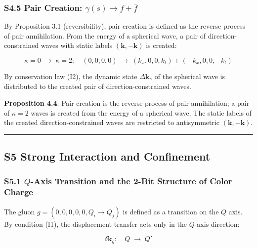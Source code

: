 \documentclass[
  a4paper,11pt]{article}
\theoremstyle{definition}
\theoremstyle{remark}
\begin{document}
\subsubsection{\texorpdfstring{S4.5 Pair Creation:
\(\gamma(s) \to f + \bar{f}\)}{S4.5 Pair Creation: \textbackslash gamma(s) \textbackslash to f + \textbackslash bar\{f\}}}\label{s4.5-pair-creation-gammas-to-f-barf}

By Proposition 3.1 (reversibility), pair creation is defined as the
reverse process of pair annihilation. From the energy of a spherical
wave, a pair of direction-constrained waves with static labels
\((\mathbf{k}, -\mathbf{k})\) is created:

\[\kappa = 0 \;\longrightarrow\; \kappa = 2:\quad (0, 0, 0, 0) \;\longrightarrow\; (k_x, 0, 0, k_t) + (-k_x, 0, 0, -k_t)\]

By conservation law (I2), the dynamic state \(\Delta\mathbf{k}_\gamma\)
of the spherical wave is distributed to the created pair of
direction-constrained waves.

\textbf{Proposition 4.4}: Pair creation is the reverse process of pair
annihilation; a pair of \(\kappa = 2\) waves is created from the energy
of a spherical wave. The static labels of the created
direction-constrained waves are restricted to antisymmetric
\((\mathbf{k}, -\mathbf{k})\).

\begin{center}\rule{0.5\linewidth}{0.5pt}\end{center}

\subsection{S5 Strong Interaction and
Confinement}\label{s5-strong-interaction-and-confinement}

\subsubsection{\texorpdfstring{S5.1 \(Q\)-Axis Transition and the 2-Bit
Structure of Color
Charge}{S5.1 Q-Axis Transition and the 2-Bit Structure of Color Charge}}\label{s5.1-q-axis-transition-and-the-2-bit-structure-of-color-charge}

The gluon \(g = (0, 0, 0, 0, 0, Q_i \to Q_j)\) is defined as a
transition on the \(Q\) axis. By condition (I1), the displacement
transfer acts only in the \(Q\)-axis direction:

\[\delta\mathbf{k}_g: \quad Q \;\longrightarrow\; Q'\]
\end{document}
